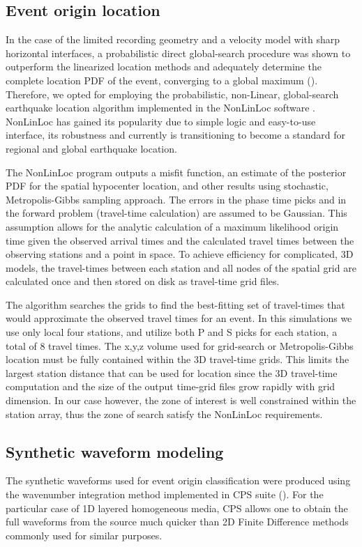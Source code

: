 \subsection{Event origin location} %
In the case of the limited recording geometry and a velocity model with sharp horizontal interfaces, a probabilistic direct global-search procedure was shown to outperform the linearized location methods and adequately determine the complete location PDF of the event, converging to a global maximum (\citet{lomax_earthquakeearthquake_2009}). Therefore, we opted for employing the probabilistic, non-Linear, global-search earthquake location algorithm implemented in the NonLinLoc software \cite{lomax_precise_2001}. NonLinLoc has gained its popularity due to simple logic and easy-to-use interface, its robustness and currently is transitioning to become a standard for regional and global earthquake location.

The NonLinLoc program outputs a misfit function, an estimate of the posterior PDF for the spatial hypocenter location, and other results using stochastic, Metropolis-Gibbs sampling approach. The errors in the phase time picks and in the forward problem (travel-time calculation) are assumed to be Gaussian. This assumption allows for the analytic calculation of a maximum likelihood origin time given the observed arrival times and the calculated travel times between the observing stations and a point in space. To achieve efficiency for complicated, 3D models, the travel-times between each station and all nodes of the spatial grid are calculated once and then stored on disk as travel-time grid files.

The algorithm searches the grids to find the best-fitting set of travel-times that would approximate the observed travel times for an event. In this simulations we use only local four stations, and utilize both P and S picks for each station, a total of 8 travel times. The x,y,z volume used for grid-search or Metropolis-Gibbs location must be fully contained within the 3D travel-time grids. This limits the largest station distance that can be used for location since the 3D travel-time computation and the size of the output time-grid files grow rapidly with grid dimension. In our case however, the zone of interest is well constrained within the station array, thus the zone of search satisfy the NonLinLoc requirements.

\subsection{Synthetic waveform modeling}
The synthetic waveforms used for event origin classification were produced using the wavenumber integration method implemented in CPS suite (\cite{herrmann_computer_2013}). For the particular case of 1D layered homogeneous media, CPS allows one to obtain the full waveforms from the source much quicker than 2D Finite Difference methods commonly used for similar purposes.

